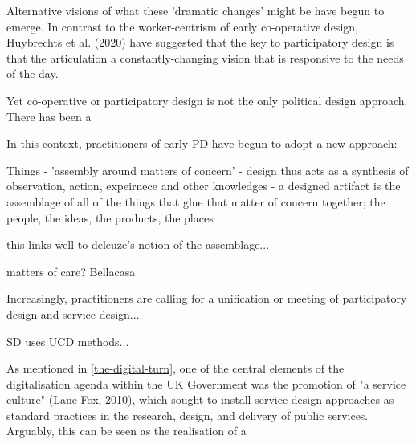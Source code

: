 Alternative visions of what these 'dramatic changes' might be have begun to emerge. In contrast to the worker-centrism of early co-operative design, Huybrechts et al. (2020) have suggested that the key to participatory design is that the articulation a constantly-changing vision that is responsive to the needs of the day. 
% 

Yet co-operative or participatory design is not the only political design approach. There has been a 




  
In this context, practitioners of early PD have begun to adopt a new approach:

Things - 'assembly around matters of concern'  - design thus acts as a synthesis of observation, action, expeirnece and other knowledges - a designed artifact is the assemblage of all of the things that glue that matter of concern together; the people, the ideas, the products, the places

this links well to deleuze's notion of the assemblage...
	
matters of care? Bellacasa

Increasingly, practitioners are calling for a unification or meeting of participatory design and service design...

SD uses UCD methods...


As mentioned in \ref{the-digital-turn}, one of the central elements of the digitalisation agenda within the UK Government was the promotion of "a service culture" (Lane Fox, 2010), which sought to install service design approaches as standard practices in the research, design, and delivery of public services. Arguably, this can be seen as the realisation of a


